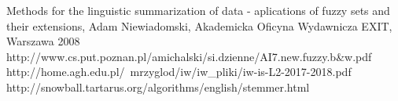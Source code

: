 \documentclass{classrep}
\begin{document}
	

\begin{thebibliography}{}
Methods for the linguistic summarization of data - aplications of fuzzy sets and their extensions, Adam Niewiadomski, Akademicka Oficyna Wydawnicza EXIT, Warszawa 2008
http://www.cs.put.poznan.pl/amichalski/si.dzienne/AI7.new.fuzzy.b&w.pdf
http://home.agh.edu.pl/~mrzyglod/iw/iw_pliki/iw-is-L2-2017-2018.pdf
http://snowball.tartarus.org/algorithms/english/stemmer.html
\end{thebibliography}
\end{document}
